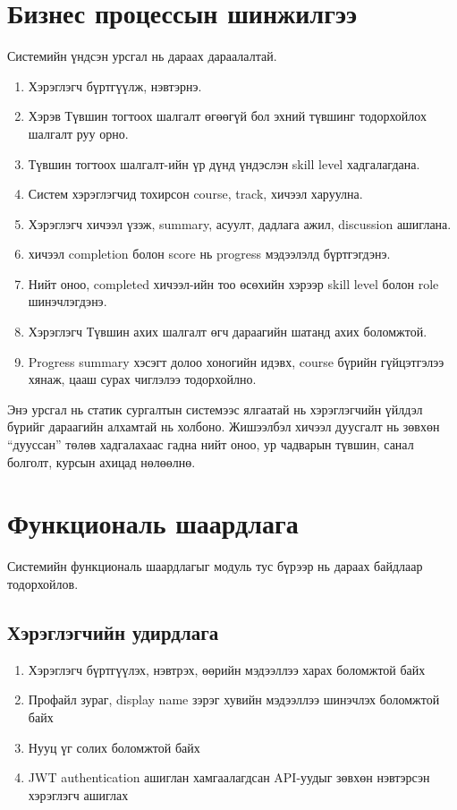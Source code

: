 \section{Бизнес процессын шинжилгээ}
Системийн үндсэн урсгал нь дараах дараалалтай.
\begin{enumerate}
\item Хэрэглэгч бүртгүүлж, нэвтэрнэ.
\item Хэрэв Түвшин тогтоох шалгалт өгөөгүй бол эхний түвшинг тодорхойлох шалгалт руу орно.
\item Түвшин тогтоох шалгалт-ийн үр дүнд үндэслэн skill level хадгалагдана.
\item Систем хэрэглэгчид тохирсон course, track, хичээл харуулна.
\item Хэрэглэгч хичээл үзэж, summary, асуулт, дадлага ажил, discussion ашиглана.
\item хичээл completion болон score нь progress мэдээлэлд бүртгэгдэнэ.
\item Нийт оноо, completed хичээл-ийн тоо өсөхийн хэрээр skill level болон role шинэчлэгдэнэ.
\item Хэрэглэгч Түвшин ахих шалгалт өгч дараагийн шатанд ахих боломжтой.
\item Progress summary хэсэгт долоо хоногийн идэвх, course бүрийн гүйцэтгэлээ хянаж, цааш сурах чиглэлээ тодорхойлно.
\end{enumerate}

Энэ урсгал нь статик сургалтын системээс ялгаатай нь хэрэглэгчийн үйлдэл бүрийг дараагийн алхамтай нь холбоно. Жишээлбэл хичээл дуусгалт нь зөвхөн ``дууссан'' төлөв хадгалахаас гадна нийт оноо, ур чадварын түвшин, санал болголт, курсын ахицад нөлөөлнө.

\section{Функциональ шаардлага}
Системийн функциональ шаардлагыг модуль тус бүрээр нь дараах байдлаар тодорхойлов.

\subsection{Хэрэглэгчийн удирдлага}
\begin{enumerate}
\item Хэрэглэгч бүртгүүлэх, нэвтрэх, өөрийн мэдээллээ харах боломжтой байх
\item Профайл зураг, display name зэрэг хувийн мэдээллээ шинэчлэх боломжтой байх
\item Нууц үг солих боломжтой байх
\item JWT authentication ашиглан хамгаалагдсан API-уудыг зөвхөн нэвтэрсэн хэрэглэгч ашиглах
\end{enumerate}

